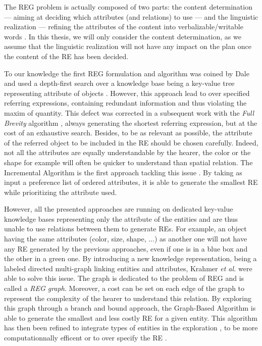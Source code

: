 \documentclass[a4paper,11pt,twoside]{StyleThese}
\begin{document}
The REG problem is actually composed of two parts: the content determination --- aiming at deciding which attributes (and relations) to use --- and the linguistic realization --- refining the attributes of the content into verbalizable/writable words \cite{krahmer2012computational}. In this thesis, we will only consider the content determination, as we assume that the linguistic realization will not have any impact on the plan once the content of the RE has been decided.

To our knowledge the first REG formulation and algorithm was coined by Dale and used a depth-first search over a knowledge base being a key-value tree representing attribute of objects \cite{dale1989cooking}. However, this approach lead to over specified referring expressions, containing redundant information and thus violating the maxim of quantity. This defect was corrected in a subsequent work with the \textit{Full Brevity} algorithm \cite{dale1992generating}, always generating the shortest referring expression, but at the cost of an exhaustive search. Besides, to be as relevant as possible, the attribute of the referred object to be included in the RE should be chosen carefully. Indeed, not all the attributes are equally understandable by the hearer, the color or the shape for example will often be quicker to understand than spatial relation. The Incremental Algorithm is the first approach tackling this issue \cite{dale1995computational}. By taking as input a preference list of ordered attributes, it is able to generate the smallest RE while prioritizing the attribute used.

However, all the presented approaches are running on dedicated key-value knowledge bases representing only the attribute of the entities and are thus unable to use relations between them to generate REs. For example, an object having the same attributes (color, size, shape, ...) as another one will not have any RE generated by the previous approaches, even if one is in a blue box and the other in a green one. By introducing a new knowledge representation, being a labeled directed multi-graph linking entities and attributes, Krahmer \textit{et al.} were able to solve this issue. The graph is dedicated to the problem of REG and is called a \textit{REG graph}. Moreover, a cost can be set on each edge of the graph to represent the complexity of the hearer to understand this relation. By exploring this graph through a branch and bound approach, the Graph-Based Algorithm \cite{krahmer2003graph} is able to generate the smallest and less costly RE for a given entity. This algorithm has then been refined to integrate types of entities in the exploration \cite{krahmer2012computational}, to be more computationnally efficent \cite{li2017automatically} or to over specify the RE \cite{viethen2013graphs}.
\end{document}
